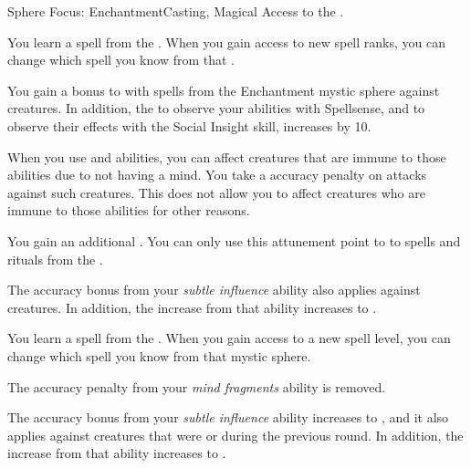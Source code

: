    \begin{feat}{Sphere Focus: Enchantment}{Casting, Magical}
        \featpre Access to the  .

         You learn a spell from the  .
        When you gain access to new spell ranks, you can change which spell you know from that .

         You gain a  bonus to  with spells from the Enchantment mystic sphere against \unaware creatures.
        In addition, the  to observe your  abilities with Spellsense, and to observe their effects with the Social Insight skill, increases by 10.

         When you use  and  abilities, you can affect creatures that are immune to those abilities due to not having a mind.
        You take a  accuracy penalty on attacks against such creatures.
        This does not allow you to affect creatures who are immune to those abilities for other reasons.

         You gain an additional .
        You can only use this attunement point to  to spells and rituals from the  .

         The accuracy bonus from your \textit{subtle influence} ability also applies against \partiallyunaware creatures.
        In addition, the  increase from that ability increases to .

         You learn a spell from the  .
        When you gain access to a new spell level, you can change which spell you know from that mystic sphere.

         The accuracy penalty from your \textit{mind fragments} ability is removed.

         The accuracy bonus from your \textit{subtle influence} ability increases to , and it also applies against creatures that were \unaware or \partiallyunaware during the previous round.
        In addition, the  increase from that ability increases to .
    \end{feat}

